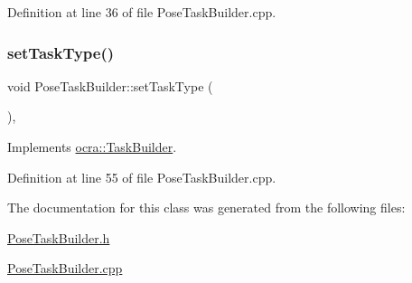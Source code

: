 Definition at line 36 of file Pose\+Task\+Builder.\+cpp.

\hypertarget{classocra_1_1PoseTaskBuilder_aafc5b611352f7cbebecaa51cf534c68c}{}\label{classocra_1_1PoseTaskBuilder_aafc5b611352f7cbebecaa51cf534c68c} 
\subsubsection{\texorpdfstring{set\+Task\+Type()}{setTaskType()}}
{\footnotesize\ttfamily void Pose\+Task\+Builder\+::set\+Task\+Type (\begin{DoxyParamCaption}{ }\end{DoxyParamCaption})\hspace{0.3cm}{\ttfamily [protected]}, {\ttfamily [virtual]}}



Implements \hyperlink{classocra_1_1TaskBuilder_a1a979fc495be6dc30483aa8fd0ff2650}{ocra\+::\+Task\+Builder}.



Definition at line 55 of file Pose\+Task\+Builder.\+cpp.



The documentation for this class was generated from the following files\+:\begin{DoxyCompactItemize}
\item 
\hyperlink{PoseTaskBuilder_8h}{Pose\+Task\+Builder.\+h}\item 
\hyperlink{PoseTaskBuilder_8cpp}{Pose\+Task\+Builder.\+cpp}\end{DoxyCompactItemize}
